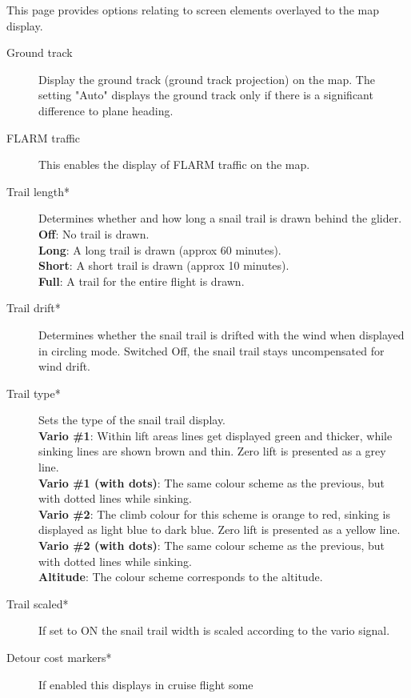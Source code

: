 This page provides options relating to screen elements overlayed to the map display.

\begin{description}
\item[Ground track]  Display the ground track (ground track projection) on the map.
  The setting "Auto" displays the ground track only if there is a significant 
  difference to plane heading.
\item[FLARM traffic]  \label{conf:flarm-on-map} This enables the display of FLARM 
  traffic on the map.
\item[Trail length*] \label{conf:snailtrail} Determines whether and how long a
  snail trail is drawn behind the glider. \\
  {\bf Off}: No trail is drawn. \\
  {\bf Long}: A long trail is drawn (approx 60 minutes). \\
  {\bf Short}: A short trail is drawn (approx 10 minutes). \\
  {\bf Full}: A trail for the entire flight is drawn.
\item[Trail drift*] \label{conf:traildrift} Determines whether the
  snail trail is drifted with the wind when displayed in circling mode.  Switched Off,
  the snail trail stays uncompensated for wind drift.
\item[Trail type*] \label{conf:snailtype} Sets the type of the snail trail display. \\
  {\bf Vario \#1}: Within lift areas lines get displayed green and
  thicker, while sinking lines are shown brown and thin.  Zero lift
  is presented as a grey line. \\
  {\bf Vario \#1 (with dots)}: The same colour scheme as the previous, but with dotted 
  lines while sinking. \\
  {\bf Vario \#2}: The climb colour for this scheme is orange to red, sinking is
  displayed as light blue to dark blue. Zero lift is presented as a yellow line. \\
  {\bf Vario \#2 (with dots)}: The same colour scheme as the previous, but with dotted 
  lines while sinking. \\
  {\bf Altitude}: The colour scheme corresponds to the altitude.
\item[Trail scaled*] \label{conf:trailscaled} If set to ON the snail trail 
  width is scaled according to the vario signal.
\item[Detour cost markers*]  If enabled this displays in cruise flight some

\end{description}
